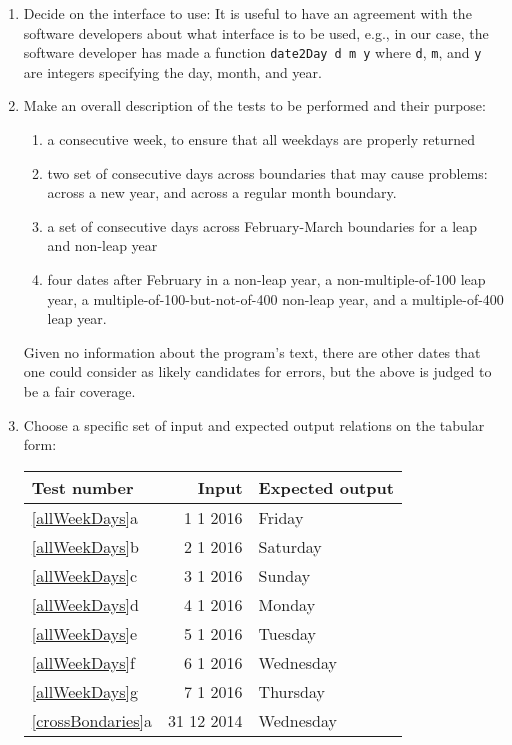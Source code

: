 \begin{enumerate}
\item Decide on the interface to use: It is useful to have an agreement with the software developers about what interface is to be used, e.g., in our case, the software developer has made a function \lstinline!date2Day d m y! where \lstinline!d!, \lstinline!m!, and \lstinline!y! are integers specifying the day, month, and year.
\item Make an overall description of the tests to be performed and their purpose:
  \begin{enumerate}[label=\arabic*]
  \item\label{allWeekDays} a consecutive week, to ensure that all weekdays are properly returned
  \item\label{crossBondaries} two set of consecutive days across boundaries that may cause problems: across a new year, and across a regular month boundary.
  \item\label{februaryBoundaries} a set of consecutive days across February-March boundaries for a leap and non-leap year
  \item\label{leapYears} four dates after February in a non-leap year, a non-multiple-of-100 leap year, a multiple-of-100-but-not-of-400 non-leap year, and a multiple-of-400 leap year.
  \end{enumerate}
  Given no information about the program's text, there are other dates that one could consider as likely candidates for errors, but the above is judged to be a fair coverage.
\item Choose a specific set of input and expected output relations on the tabular form:
\begin{center}
  \begin{tabular}{|l|r|l|}
    \hline
    \rowcolor{headerRowColor} Test number&Input& Expected output\\
    \hline
    \ref{allWeekDays}a&1 1 2016&Friday\\
    \ref{allWeekDays}b&2 1 2016&Saturday\\
    \ref{allWeekDays}c&3 1 2016&Sunday\\
    \ref{allWeekDays}d&4 1 2016&Monday\\
    \ref{allWeekDays}e&5 1 2016&Tuesday\\
    \ref{allWeekDays}f&6 1 2016&Wednesday\\
    \ref{allWeekDays}g&7 1 2016&Thursday\\
    \hline
    \ref{crossBondaries}a&31 12 2014&Wednesday\\

\end{tabular}
\end{center}
\end{enumerate}
